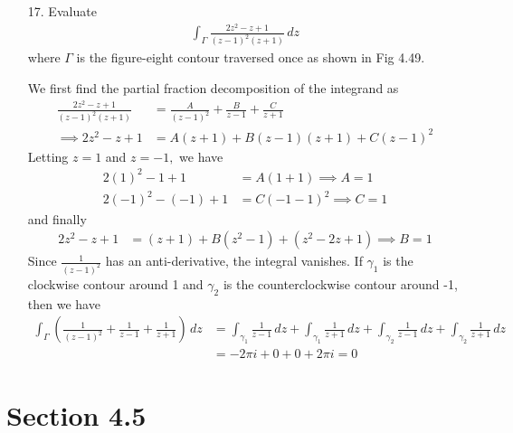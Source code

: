 \documentclass{article}
\begin{document}
\begin{itemize}
	\item[17.] Evaluate
		\begin{align*}
			\int_\Gamma \frac{2z^2-z+1}{(z-1)^2(z+1)}\, dz
		\end{align*}
		where $\Gamma$ is the figure-eight contour traversed once as shown in Fig 4.49.
		\begin{soln}
			We first find the partial fraction decomposition of the integrand as
			\begin{align*}
				\frac{2z^2-z+1}{(z-1)^2(z+1)} &= \frac{A}{(z-1)^2}+\frac{B}{z-1} + \frac{C}{z+1} \\
				\implies 2z^2-z+1 &= A(z+1) + B(z-1)(z+1) + C(z-1)^2
			\end{align*}
			Letting $z=1$ and $z=-1,$ we have 
			\begin{align*}
				2(1)^2-1+1 &= A(1+1) \implies A = 1 \\
				2(-1)^2-(-1)+1 &= C(-1-1)^2 \implies C = 1
			\end{align*}
			and finally
			\begin{align*}
				2z^2-z+1 &= (z+1) + B(z^2-1) + (z^2-2z+1) \implies B = 1
			\end{align*}
			Since $\frac{1}{(z-1)^2}$ has an anti-derivative, the integral vanishes. If $\gamma_1$ is the clockwise contour around 1 and $\gamma_2$ is the counterclockwise contour around -1, then we have
			\begin{align*}
				\int_\Gamma \left( \frac{1}{(z-1)^2} + \frac{1}{z-1} + \frac{1}{z+1} \right)\, dz &= \int_{\gamma_1} \frac{1}{z-1}\, dz + \int_{\gamma_1}\frac{1}{z+1}\, dz + \int_{\gamma_2} \frac{1}{z-1}\, dz + \int_{\gamma_2} \frac{1}{z+1}\, dz \\
				&= -2\pi i + 0 + 0 + 2\pi i = 0
			\end{align*}
		\end{soln}
		
\end{itemize}

\section*{Section 4.5}
\end{document}
